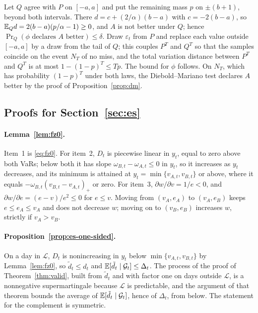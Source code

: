 Let $Q$ agree with $P$ on $[-a,a]$ and put the remaining mass $p$ on
$\pm(b+1)$, beyond both intervals. There $d=c+(2/\alpha)(b-a)$ with
$c=-2(b-a)$, so $\mathbb{E}_Qd=2(b-a)(p/\alpha-1)\ge0$, and $A$ is not better
under $Q$; hence $\Pr_Q(\phi\text{ declares }A\text{ better})\le\delta$. Draw
$\varepsilon_t$ from $P$ and replace each value outside $[-a,a]$ by a draw
from the tail of $Q$; this couples $P^T$ and $Q^T$ so that the samples
coincide on the event $N_T$ of no miss, and the total variation distance
between $P^T$ and $Q^T$ is at most $1-(1-p)^T\le Tp$. The bound for $\phi$
follows. On $N_T$, which has probability $(1-p)^T$ under both laws, the
Diebold--Mariano test declares $A$ better by the proof of
Proposition~\ref{prop:dm}.

\subsection{Proofs for Section~\ref{sec:es}}

\paragraph{Lemma~\ref{lem:fz0}.}
Item~1 is \eqref{eq:fz0}. For item~2, $D_t$ is piecewise linear in $y_t$,
equal to zero above both VaRs; below both it has slope $\omega_{B,t}-\omega_{A,t}\le0$
in $y_t$, so it increases as $y_t$ decreases, and its minimum is attained at
$y_t=\min\{v_{A,t},v_{B,t}\}$ or above, where it equals
$-\omega_{B,t}(v_{B,t}-v_{A,t})_+$ or zero. For item~3,
$\partial w/\partial v=1/e<0$, and $\partial w/\partial e=(e-v)/e^2\le0$
for $e\le v$. Moving from $(v_A,e_A)$ to $(v_A,e_B)$ keeps $e\le e_A\le v_A$
and does not decrease $w$; moving on to $(v_B,e_B)$ increases $w$, strictly
if $v_A>v_B$.

\paragraph{Proposition~\ref{prop:es-one-sided}.}
On a day in $\mathcal L$, $D_t$ is nonincreasing in $y_t$ below
$\min\{v_{A,t},v_{B,t}\}$ by Lemma~\ref{lem:fz0}, so $\tilde d_t\le d_t$
and $\mathbb{E}[\tilde d_t\mid\mathcal{G}_t]\le\Delta_t$. The process of the proof of
Theorem~\ref{thm:valid}, built from $\tilde d_t$ and with factor one on days
outside $\mathcal L$, is a nonnegative supermartingale because $\mathcal L$
is predictable, and the argument of that theorem bounds the average of
$\mathbb{E}[\tilde d_t\mid\mathcal{G}_t]$, hence of $\Delta_t$, from below. The statement
for the complement is symmetric.

